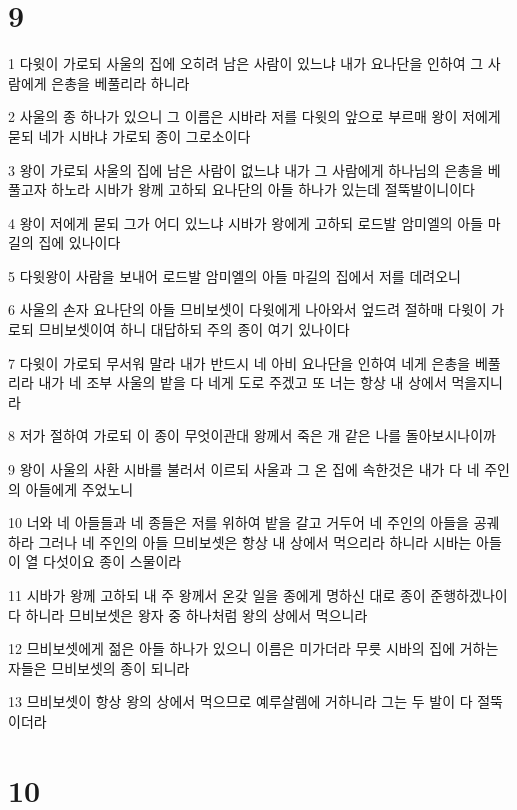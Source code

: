 \chapter{9}

\par 1 다윗이 가로되 사울의 집에 오히려 남은 사람이 있느냐 내가 요나단을 인하여 그 사람에게 은총을 베풀리라 하니라
\par 2 사울의 종 하나가 있으니 그 이름은 시바라 저를 다윗의 앞으로 부르매 왕이 저에게 묻되 네가 시바냐 가로되 종이 그로소이다
\par 3 왕이 가로되 사울의 집에 남은 사람이 없느냐 내가 그 사람에게 하나님의 은총을 베풀고자 하노라 시바가 왕께 고하되 요나단의 아들 하나가 있는데 절뚝발이니이다
\par 4 왕이 저에게 묻되 그가 어디 있느냐 시바가 왕에게 고하되 로드발 암미엘의 아들 마길의 집에 있나이다
\par 5 다윗왕이 사람을 보내어 로드발 암미엘의 아들 마길의 집에서 저를 데려오니
\par 6 사울의 손자 요나단의 아들 므비보셋이 다윗에게 나아와서 엎드려 절하매 다윗이 가로되 므비보셋이여 하니 대답하되 주의 종이 여기 있나이다
\par 7 다윗이 가로되 무서워 말라 내가 반드시 네 아비 요나단을 인하여 네게 은총을 베풀리라 내가 네 조부 사울의 밭을 다 네게 도로 주겠고 또 너는 항상 내 상에서 먹을지니라
\par 8 저가 절하여 가로되 이 종이 무엇이관대 왕께서 죽은 개 같은 나를 돌아보시나이까
\par 9 왕이 사울의 사환 시바를 불러서 이르되 사울과 그 온 집에 속한것은 내가 다 네 주인의 아들에게 주었노니
\par 10 너와 네 아들들과 네 종들은 저를 위하여 밭을 갈고 거두어 네 주인의 아들을 공궤하라 그러나 네 주인의 아들 므비보셋은 항상 내 상에서 먹으리라 하니라 시바는 아들이 열 다섯이요 종이 스물이라
\par 11 시바가 왕께 고하되 내 주 왕께서 온갖 일을 종에게 명하신 대로 종이 준행하겠나이다 하니라 므비보셋은 왕자 중 하나처럼 왕의 상에서 먹으니라
\par 12 므비보셋에게 젊은 아들 하나가 있으니 이름은 미가더라 무릇 시바의 집에 거하는 자들은 므비보셋의 종이 되니라
\par 13 므비보셋이 항상 왕의 상에서 먹으므로 예루살렘에 거하니라 그는 두 발이 다 절뚝이더라

\chapter{10}

